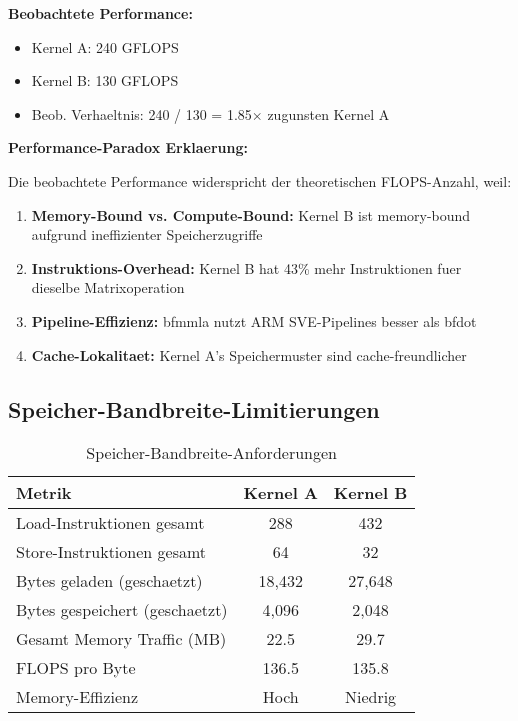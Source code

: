 \documentclass[11pt,a4paper]{article}
\begin{document}
\textbf{Beobachtete Performance:}
\begin{itemize}
\item Kernel A: 240 GFLOPS
\item Kernel B: 130 GFLOPS  
\item Beob. Verhaeltnis: 240 / 130 = 1.85$\times$ zugunsten Kernel A
\end{itemize}

\textbf{Performance-Paradox Erklaerung:}

Die beobachtete Performance widerspricht der theoretischen FLOPS-Anzahl, weil:

\begin{enumerate}
\item \textbf{Memory-Bound vs. Compute-Bound:} Kernel B ist memory-bound aufgrund ineffizienter Speicherzugriffe
\item \textbf{Instruktions-Overhead:} Kernel B hat 43\% mehr Instruktionen fuer dieselbe Matrixoperation
\item \textbf{Pipeline-Effizienz:} bfmmla nutzt ARM SVE-Pipelines besser als bfdot
\item \textbf{Cache-Lokalitaet:} Kernel A's Speichermuster sind cache-freundlicher
\end{enumerate}

\subsection{Speicher-Bandbreite-Limitierungen}

\begin{table}[H]
\centering
\caption{Speicher-Bandbreite-Anforderungen}
\begin{tabular}{lcc}
\toprule
\textbf{Metrik} & \textbf{Kernel A} & \textbf{Kernel B} \\
\midrule
Load-Instruktionen gesamt & 288 & 432 \\
Store-Instruktionen gesamt & 64 & 32 \\
Bytes geladen (geschaetzt) & 18,432 & 27,648 \\
Bytes gespeichert (geschaetzt) & 4,096 & 2,048 \\
Gesamt Memory Traffic (MB) & 22.5 & 29.7 \\
FLOPS pro Byte & 136.5 & 135.8 \\
Memory-Effizienz & Hoch & Niedrig \\
\bottomrule
\end{tabular}
\end{table}
\end{document}
